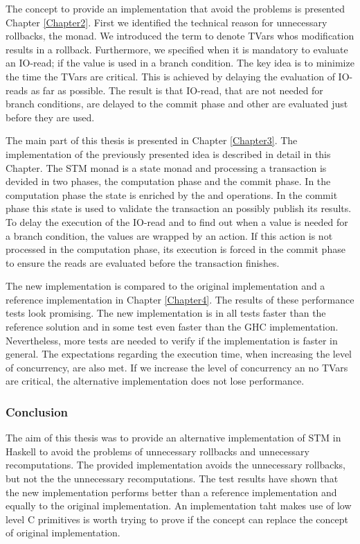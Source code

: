 The concept to provide an implementation that avoid the problems is presented Chapter \ref{Chapter2}.
First we identified the technical reason for unnecessary rollbacks, the monad. We introduced the term
 to denote TVars whos modification results in a rollback. Furthermore, we 
specified when it is mandatory to evaluate an IO-read; if the value is used in a branch condition.
The key idea is to minimize the time the TVars are critical. This is achieved by delaying the 
evaluation of IO-reads as far as possible. The result is that IO-read, that are not needed for branch 
conditions, are delayed to the commit phase and other are evaluated just before they are used.

The main part of this thesis is presented in Chapter \ref{Chapter3}. The implementation of the previously 
presented idea is described in detail in this Chapter. The STM monad is a state monad and processing a
transaction is devided in two phases, the computation phase and the commit phase. In the computation
phase the state is enriched by the  and  operations. In the commit phase 
this state is used to validate the transaction an possibly publish its results. To delay the execution 
of the IO-read and to find out when a value is needed for a branch condition, the values are wrapped 
by an  action. If this action is not processed in the computation phase, its 
execution is forced in the commit phase to ensure the reads are evaluated before the transaction 
finishes. 

The new implementation is compared to the original implementation and a reference implementation in
Chapter \ref{Chapter4}. The results of these performance tests look promising. The new implementation
is in all tests faster than the reference solution and in some test even faster than the GHC implementation.
Nevertheless, more tests are needed to verify if the implementation is faster in general. The expectations 
regarding the execution time, when increasing the level of concurrency, are also met. If we increase the 
level of concurrency an no TVars are critical, the alternative implementation does not lose performance.

\subsubsection{Conclusion}
The aim of this thesis was to provide an alternative implementation of STM in Haskell to avoid the 
problems of unnecessary rollbacks and unnecessary recomputations. The provided implementation 
avoids the unnecessary rollbacks, but not the the unnecessary recomputations. The test results 
have shown that the new implementation performs better than a reference implementation and equally
to the original implementation. An implementation taht makes use of low level C primitives is 
worth trying to prove if the concept can replace the concept of original implementation.  